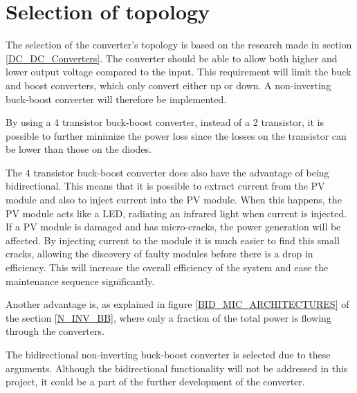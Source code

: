 \section{Selection of topology}
The selection of the converter's topology is based on the research made in section \ref{DC_DC_Converters}. The converter should be able to allow both higher and lower output voltage compared to the input. This requirement will limit the buck and boost converters, which only convert either up or down. A non-inverting buck-boost converter will therefore be implemented.

By using a 4 transistor buck-boost converter, instead of a 2 transistor, it is possible to further minimize the power loss since the losses on the transistor can be lower than those on the diodes.

The 4 transistor buck-boost converter does also have the advantage of being bidirectional. This means that it is possible to extract current from the PV module and also to inject current into the PV module. When this happens, the PV module acts like a LED, radiating an infrared light when current is injected. If a PV module is damaged and has micro-cracks, the power generation will be affected. By injecting current to the module it is much easier to find this small cracks, allowing the discovery of faulty modules before there is a drop in efficiency. This will increase the overall efficiency of the system and ease the maintenance sequence significantly. \cite{selectionMPPT} 

Another advantage is, as explained in figure \ref{BID_MIC_ARCHITECTURES} of the section \ref{N_INV_BB}, where only a fraction of the total power is flowing through the converters.

The bidirectional non-inverting buck-boost converter is selected due to these arguments. Although the bidirectional functionality will not be addressed in this project, it could be a part of the further development of the converter. 






 